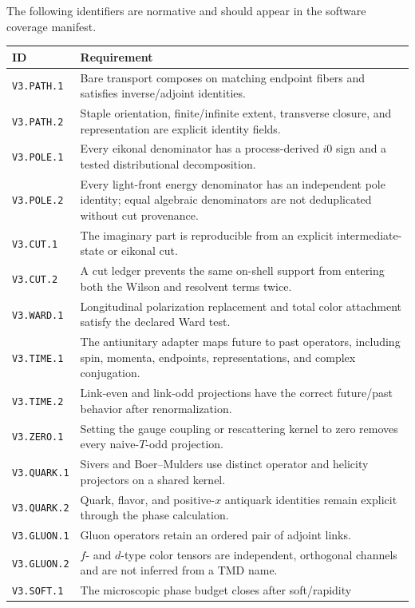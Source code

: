 \documentclass[11pt]{article}
\begin{document}
The following identifiers are normative and should appear in the software
coverage manifest.
\begin{longtable}{L{0.14\textwidth}L{0.77\textwidth}}
\toprule
ID & Requirement\\
\midrule
\endhead
\texttt{V3.PATH.1} & Bare transport composes on matching endpoint fibers and
satisfies inverse/adjoint identities.\\
\texttt{V3.PATH.2} & Staple orientation, finite/infinite extent, transverse
closure, and representation are explicit identity fields.\\
\texttt{V3.POLE.1} & Every eikonal denominator has a process-derived \(i0\)
sign and a tested distributional decomposition.\\
\texttt{V3.POLE.2} & Every light-front energy denominator has an independent
pole identity; equal algebraic denominators are not deduplicated without cut
provenance.\\
\texttt{V3.CUT.1} & The imaginary part is reproducible from an explicit
intermediate-state or eikonal cut.\\
\texttt{V3.CUT.2} & A cut ledger prevents the same on-shell support from
entering both the Wilson and resolvent terms twice.\\
\texttt{V3.WARD.1} & Longitudinal polarization replacement and total color
attachment satisfy the declared Ward test.\\
\texttt{V3.TIME.1} & The antiunitary adapter maps future to past operators,
including spin, momenta, endpoints, representations, and complex conjugation.\\
\texttt{V3.TIME.2} & Link-even and link-odd projections have the correct
future/past behavior after renormalization.\\
\texttt{V3.ZERO.1} & Setting the gauge coupling or rescattering kernel to zero
removes every naive-\(T\)-odd projection.\\
\texttt{V3.QUARK.1} & Sivers and Boer--Mulders use distinct operator and
helicity projectors on a shared kernel.\\
\texttt{V3.QUARK.2} & Quark, flavor, and positive-\(x\) antiquark identities
remain explicit through the phase calculation.\\
\texttt{V3.GLUON.1} & Gluon operators retain an ordered pair of adjoint links.\\
\texttt{V3.GLUON.2} & \(f\)- and \(d\)-type color tensors are independent,
orthogonal channels and are not inferred from a TMD name.\\
\texttt{V3.SOFT.1} & The microscopic phase budget closes after soft/rapidity

\end{longtable}
\end{document}
